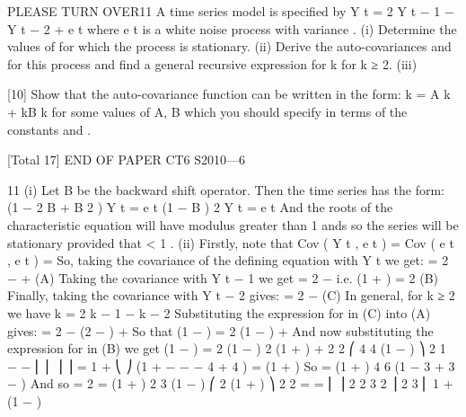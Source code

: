 PLEASE TURN OVER11
A time series model is specified by
Y t = 2 \alpha Y t − 1 −  Y t − 2 + e t
where e t is a white noise process with variance  .
(i) Determine the values of \alpha for which the process is stationary.
(ii) Derive the auto-covariances  and  for this process and find a general
recursive expression for \gamma k for k ≥ 2.
(iii)

[10]
Show that the auto-covariance function can be written in the form:
\gamma k = A \alpha k + kB \alpha k
for some values of A, B which you should specify in terms of the constants \alpha
and  .

[Total 17]
END OF PAPER
CT6 S2010—6

11
(i)
Let B be the backward shift operator. Then the time series has the form:
(1 − 2 \alpha B +  B 2 ) Y t = e t
(1 − \alpha B ) 2 Y t = e t
And the roots of the characteristic equation will have modulus greater than 1
ands so the series will be stationary provided that \alpha < 1 .
(ii)
Firstly, note that Cov ( Y t , e t ) = Cov ( e t , e t ) = 
So, taking the covariance of the defining equation with Y t we get:
 = 2 \alpha{} −   +  (A)
Taking the covariance with Y t − 1 we get
 = 2 \alpha{} −  
i.e. (1 +  )  = 2 \alpha{}
(B)
Finally, taking the covariance with Y t − 2 gives:
 = 2 \alpha{} −   (C)
In general, for k ≥ 2 we have \gamma k = 2 \alpha\gamma k − 1 −  \gamma k − 2
Substituting the expression for  in (C) into (A) gives:
 = 2 \alpha{} −  (2 \alpha{} −   ) + 
So that
(1 −  )  = 2 \alpha (1 −  )  + 
And now substituting the expression for  in (B) we get
(1 −  )  = 2 \alpha (1 −  )  \alpha{}
2
(1 + \alpha )
+ 
2
2
⎛
4 4 \alpha (1 − \alpha ) ⎞
2
1
−
\alpha
−
⎜ ⎜
⎟ ⎟  = 
1 + \alpha
⎝
⎠
(1 +  −  −  − 4  + 4  )  = (1 +  ) 
So  =
(1 +  )
4
6
(1 − 3 \alpha + 3 \alpha − \alpha )
And so  =
2
 =
(1 +  )
2 3
(1 − \alpha )
⎛ 2 \alpha (1 +  ) ⎞ 2
2 \alpha
=
\sigma
=
⎜
⎟
2
2 3
2 ⎟
2 3
⎜
1 + \alpha
(1 − \alpha )
